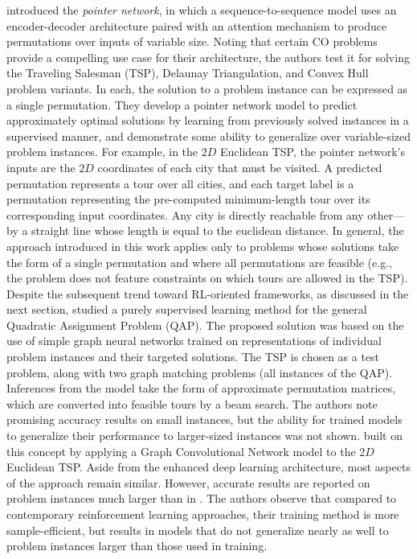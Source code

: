  introduced the \emph{pointer network}, in which a sequence-to-sequence model uses an encoder-decoder architecture paired with an attention mechanism to produce permutations over inputs of variable size. Noting that certain CO problems provide a compelling use case for their architecture, the authors test it for solving the Traveling Salesman (TSP), Delaunay Triangulation, and Convex Hull problem variants. In each, the solution to a problem instance can be expressed as a single permutation. They develop a pointer network model to predict approximately optimal solutions by learning from previously solved instances in a supervised manner, and demonstrate some ability to generalize over variable-sized problem instances. 
For example, in the $2D$ Euclidean TSP, the pointer network's inputs are the $2D$ coordinates of each city that must be visited. A predicted permutation represents a tour over all cities, and each target label is a permutation representing the pre-computed minimum-length tour over its corresponding input coordinates. Any city is directly reachable from any other---by a straight line whose length is equal to the euclidean distance. In general, the approach introduced in this work applies only to problems whose solutions take the form of a single permutation and where all permutations are feasible (e.g., the problem does not feature constraints on which tours are allowed in the TSP).
Despite the subsequent trend toward RL-oriented frameworks, as discussed in the next section,  studied a purely supervised learning method for the general Quadratic Assignment Problem (QAP). The proposed solution was based on the use of simple graph neural networks trained on representations of individual problem instances and their targeted solutions. The TSP is chosen as a test problem, along with two graph matching problems (all instances of the QAP).  Inferences from the model take the form of approximate permutation matrices, which are converted into feasible tours by a beam search. The authors note promising accuracy results on small instances, but the ability for trained models to generalize their performance to larger-sized instances was not shown.
 built on this concept by applying a Graph Convolutional Network model to the $2D$ Euclidean TSP. Aside from the enhanced deep learning architecture, most aspects of the approach remain similar. However, accurate results are reported on problem instances much larger than in .  The authors observe that compared to contemporary reinforcement learning approaches, their training method is more sample-efficient, but results in models that do not generalize nearly as well to problem instances larger than those used in training.

